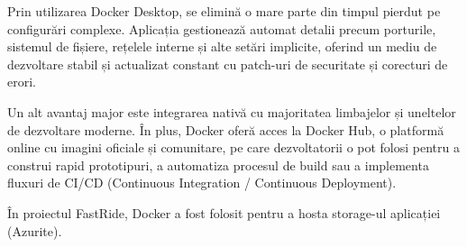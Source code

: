 Prin utilizarea Docker Desktop, se elimină o mare parte din timpul pierdut pe configurări complexe. Aplicația gestionează automat detalii precum porturile, sistemul de fișiere, rețelele interne și alte setări implicite, oferind un mediu de dezvoltare stabil și actualizat constant cu patch-uri de securitate și corecturi de erori. \parencite{docker}

Un alt avantaj major este integrarea nativă cu majoritatea limbajelor și uneltelor de dezvoltare moderne. În plus, Docker oferă acces la Docker Hub, o platformă online cu imagini oficiale și comunitare, pe care dezvoltatorii o pot folosi pentru a construi rapid prototipuri, a automatiza procesul de build sau a implementa fluxuri de CI/CD (Continuous Integration / Continuous Deployment). \parencite{docker}

În proiectul FastRide, Docker a fost folosit pentru a hosta storage-ul aplicației (Azurite).
